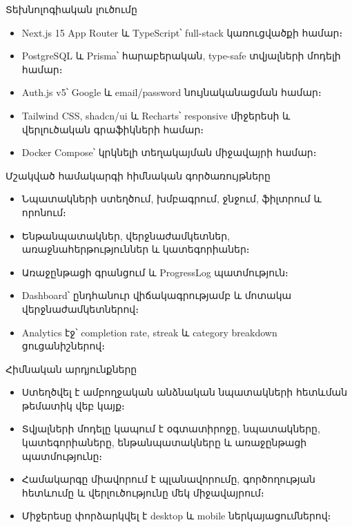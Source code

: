 \documentclass[12pt,aspectratio=169]{beamer}
\begin{document}
\begin{frame}{Տեխնոլոգիական լուծումը}
  \begin{itemize}
    \item Next.js 15 App Router և TypeScript՝ full-stack կառուցվածքի համար։
    \item PostgreSQL և Prisma՝ հարաբերական, type-safe տվյալների մոդելի համար։
    \item Auth.js v5՝ Google և email/password նույնականացման համար։
    \item Tailwind CSS, shadcn/ui և Recharts՝ responsive միջերեսի և վերլուծական գրաֆիկների համար։
    \item Docker Compose՝ կրկնելի տեղակայման միջավայրի համար։
  \end{itemize}
\end{frame}

\begin{frame}{Մշակված համակարգի հիմնական գործառույթները}
  \begin{itemize}
    \item Նպատակների ստեղծում, խմբագրում, ջնջում, ֆիլտրում և որոնում։
    \item Ենթանպատակներ, վերջնաժամկետներ, առաջնահերթություններ և կատեգորիաներ։
    \item Առաջընթացի գրանցում և ProgressLog պատմություն։
    \item Dashboard՝ ընդհանուր վիճակագրությամբ և մոտակա վերջնաժամկետներով։
    \item Analytics էջ՝ completion rate, streak և category breakdown ցուցանիշներով։
  \end{itemize}
\end{frame}

\begin{frame}{Հիմնական արդյունքները}
  \begin{itemize}
    \item Ստեղծվել է ամբողջական անձնական նպատակների հետևման թեմատիկ վեբ կայք։
    \item Տվյալների մոդելը կապում է օգտատիրոջը, նպատակները, կատեգորիաները, ենթանպատակները և առաջընթացի պատմությունը։
    \item Համակարգը միավորում է պլանավորումը, գործողության հետևումը և վերլուծությունը մեկ միջավայրում։
    \item Միջերեսը փորձարկվել է desktop և mobile ներկայացումներով։
  \end{itemize}
\end{frame}
\end{document}
